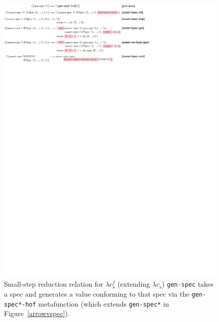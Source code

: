 \begin{figure}
  \includegraphics[]{redex/arrowvspec-hof.pdf}
  \caption{Small-step reduction relation for $\lambda c_{s}^{f}$ (extending $\lambda c_s$)
  \texttt{gen-spec} takes a spec and generates a value conforming to that spec
  via the \texttt{gen-spec*-hof} metafunction (which extends \texttt{gen-spec*} in Figure~\ref{arrowvspec}).
  }
\end{figure}
